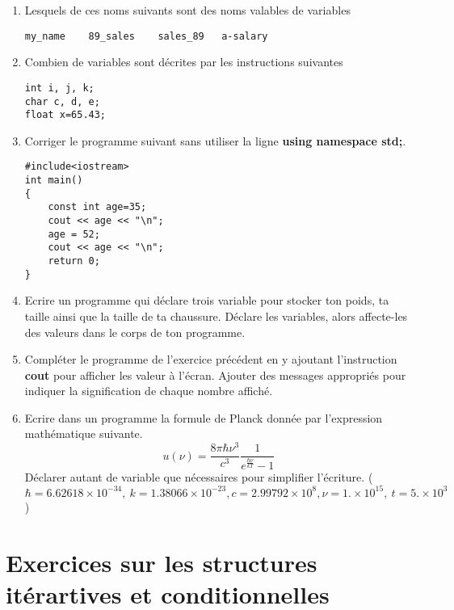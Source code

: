 \documentclass[a4paper, oneside,11pt]{book}
\begin{document}
\begin{enumerate}
\item Lesquels de ces noms suivants sont des noms valables de variables



\begin{verbatim}
my_name    89_sales    sales_89   a-salary
\end{verbatim}

\item Combien de variables sont d\'ecrites par les instructions suivantes
\begin{verbatim}
int i, j, k;
char c, d, e;
float x=65.43;
\end{verbatim}

\item Corriger le programme suivant sans utiliser la ligne \textbf{using namespace std;}.

\begin{lstlisting}
#include<iostream>
int main()
{
    const int age=35;
    cout << age << "\n";
    age = 52;
    cout << age << "\n";
    return 0;
}
\end{lstlisting} 

\item Ecrire un programme qui d\'eclare trois variable pour stocker ton poids, ta taille ainsi que la taille de ta chaussure. D\'eclare les variables, 
alors affecte-les des valeurs dans le corps de ton programme.

\item Compl\'eter le programme de l'exercice pr\'ec\'edent en y ajoutant l'instruction \textbf{cout} pour afficher les valeur \`a l'\'ecran. Ajouter des messages appropri\'es
pour indiquer la signification de chaque nombre affich\'e.  

\item Ecrire dans un programme la formule de Planck donn\'ee par l'expression 
math\'ematique suivante.
\begin{equation*}
u\left(\nu\right) = \frac{8\pi\hbar\nu^{3}}{c^{3}}\frac{1}{e^{\frac{\hbar\nu}{kT}}-1}
\end{equation*} 
D\'eclarer autant de variable que n\'ecessaires pour simplifier l'\'ecriture.
($\hbar = 6.62618\times 10^{-34},\ k = 1.38066\times 10^{-23}, c = 2.99792\times 10^{8}, \nu = 1.\times 10^{15},\ t = 5.\times 10^{3}$)
\end{enumerate}


\section{Exercices sur les structures it\'erartives et conditionnelles}
\end{document}
